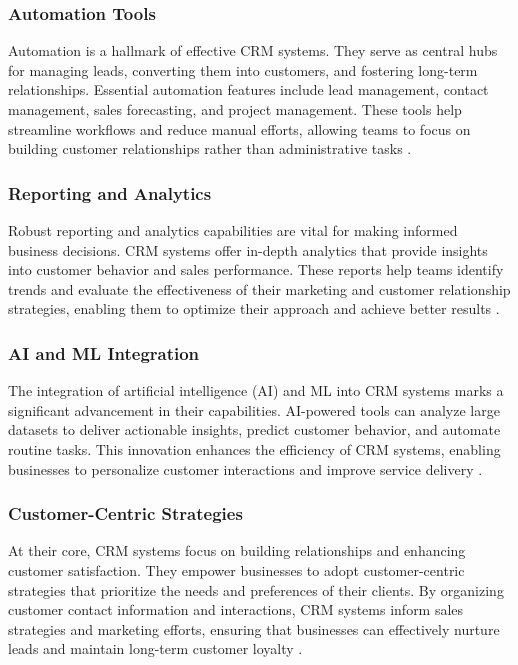 \subsubsection{Automation Tools}
Automation is a hallmark of effective CRM systems. They serve as central hubs for managing leads, converting them into customers, and fostering long-term relationships. Essential automation features include lead management, contact management, sales forecasting, and project management. These tools help streamline workflows and reduce manual efforts, allowing teams to focus on building customer relationships rather than administrative tasks \cite{forbes_crm, vtiger_crm}.

\subsubsection{Reporting and Analytics}
Robust reporting and analytics capabilities are vital for making informed business decisions. CRM systems offer in-depth analytics that provide insights into customer behavior and sales performance. These reports help teams identify trends and evaluate the effectiveness of their marketing and customer relationship strategies, enabling them to optimize their approach and achieve better results \cite{forbes_crm, medium_crm}.

\subsubsection{AI and ML Integration}
The integration of artificial intelligence (AI) and ML into CRM systems marks a significant advancement in their capabilities. AI-powered tools can analyze large datasets to deliver actionable insights, predict customer behavior, and automate routine tasks. This innovation enhances the efficiency of CRM systems, enabling businesses to personalize customer interactions and improve service delivery \cite{medium_crm}.

\subsubsection{Customer-Centric Strategies}
At their core, CRM systems focus on building relationships and enhancing customer satisfaction. They empower businesses to adopt customer-centric strategies that prioritize the needs and preferences of their clients. By organizing customer contact information and interactions, CRM systems inform sales strategies and marketing efforts, ensuring that businesses can effectively nurture leads and maintain long-term customer loyalty \cite{vtiger_crm}.


